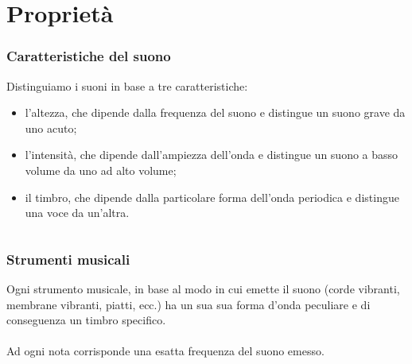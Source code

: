 \documentclass[]{beamer}
\theoremstyle{plain}
\begin{document}
\section{Proprietà}

\begin{frame}
\frametitle{Caratteristiche del suono}
Distinguiamo i suoni in base a tre caratteristiche:
\begin{itemize}
  \item l'\alert<1>{altezza}, che dipende dalla frequenza del suono e distingue un suono grave da uno acuto;\pause
  \item l'\alert<2>{intensità}, che dipende dall'ampiezza dell'onda e distingue un suono a basso volume da uno ad alto volume;\pause
  \item il \alert<3>{timbro}, che dipende dalla particolare forma dell'onda periodica e distingue una voce da un'altra.
\end{itemize}
\begin{columns}
\begin{column}{0.3\textwidth}
\end{column}
\begin{column}{0.3\textwidth}
\end{column}
\begin{column}{0.3\textwidth}
\end{column}
\end{columns}
\end{frame}


\begin{frame}
\frametitle{Strumenti musicali}
Ogni strumento musicale, in base al modo in cui emette il suono (corde vibranti, membrane vibranti, piatti, ecc.) ha un sua sua forma d'onda peculiare e di conseguenza un timbro specifico.\\~\\

Ad ogni nota corrisponde una esatta frequenza del suono emesso.\\~\\
\begin{center}
\href{video/Gopro1.mp4}{}~~~~~~~~~~~~~~~\href{video/Gopro2.mp4}{}
\end{center}
\end{frame}
\end{document}
